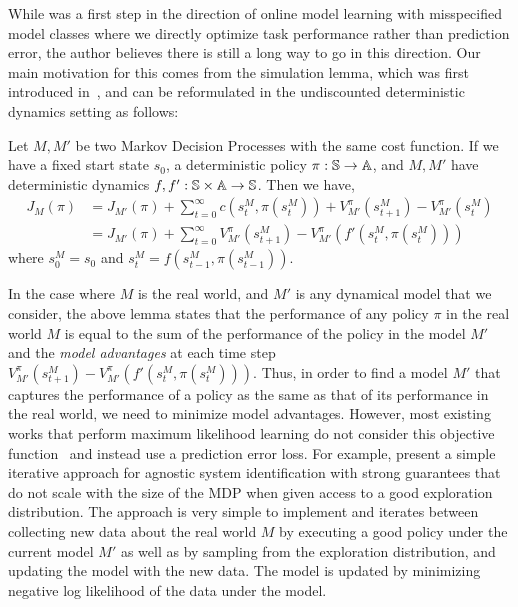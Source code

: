 While \taml{} was a first step in the direction of online model
learning with misspecified model classes where we directly optimize
task performance rather than prediction error, the author believes
there is still a long way to go in this direction. Our main motivation
for this comes from the simulation lemma, which was first introduced
in~\cite{DBLP:journals/ml/KearnsS02}, and can be reformulated in the
undiscounted deterministic dynamics setting as follows:
\begin{lemma}
  Let $M, M'$ be two Markov Decision Processes with the same cost
  function. If we have a fixed 
  start state $s_0$, a deterministic policy $\pi:\mathbb{S}
  \rightarrow \mathbb{A}$, and $M, M'$ have deterministic dynamics
  $f, f': \mathbb{S} \times \mathbb{A} \rightarrow
  \mathbb{S}$. Then we have,
  \begin{align}
    \label{eq:23}
    J_M(\pi) &= J_{M'}(\pi) + \sum_{t=0}^\infty c(s_t^M, \pi(s_t^M)) +
               V_{M'}^\pi(s_{t+1}^M) - V_{M'}^\pi(s_t^M) \\
    &= J_{M'}(\pi) + \sum_{t=0}^\infty V_{M'}^\pi(s_{t+1}^M) -
      V^\pi_{M'}(f'(s_t^M, \pi(s_t^M)))
  \end{align}
  where $s_0^M = s_0$ and $s_t^M = f(s_{t-1}^M, \pi(s_{t-1}^M))$.
\end{lemma}

In the case where $M$ is the real world, and $M'$ is any dynamical
model that we consider, the above lemma states that the performance of
any policy $\pi$ in the real world $M$ is equal to the sum of the performance of the
policy in the model $M'$ and the \textit{model advantages} at each time step $V_{M'}^\pi(s_{t+1}^M) -
      V^\pi_{M'}(f'(s_t^M, \pi(s_t^M)))$. Thus, in order to find a
      model $M'$ that captures the performance of a policy as the same
      as that of its performance in the real world, we need to
      minimize model advantages. However, most existing works that
      perform maximum likelihood learning do not consider this
      objective function~\cite{DBLP:journals/arc/Ljung10,
        DBLP:conf/icml/AbbeelN05, DBLP:conf/icml/RossB12, 
  DBLP:journals/corr/abs-1907-02057} and instead use a prediction
error loss. For example, \cite{DBLP:conf/icml/RossB12} present a simple iterative
approach for agnostic system identification with strong guarantees
that do not scale with the size of the MDP when given access to a good
exploration distribution. The approach is very simple to implement and
iterates between collecting new data about the real world $M$ by executing
a good policy under the current model $M'$ as well as by sampling from
the exploration distribution, and updating the model with the new
data. The model is updated by minimizing negative log likelihood of
the data under the model.


